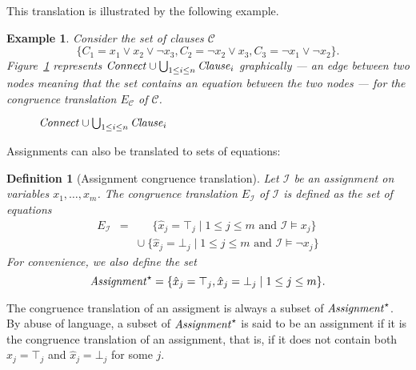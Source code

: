 \documentclass{easychair}
\newtheorem{example}{Example}
\newtheorem{definition}{Definition}
\begin{document}
\noindent This translation is illustrated by the following example.

\begin{example}\label{ex:np1}
Consider the set of clauses $\mathcal{C}$
\begin{equation*}
\big\{C_1 = x_1 \vee x_2 \vee \neg x_3, C_2 = \neg x_2 \vee x_3, C_3 = \neg x_1 \vee \neg x_2\big\}.
\end{equation*}
Figure~\ref{fig:npexamplebig} represents ${\it Connect} \cup \bigcup_{1 \leq i \leq n}{\it Clause}_i$
graphically --- an edge between two nodes meaning that the set contains an
equation between the two nodes --- for the congruence translation $E_{\mathcal{C}}$ of
$\mathcal{C}$.

\begin{figure}[ht]

\caption{${\it Connect} \cup \bigcup_{1 \leq i \leq n}{\it Clause}_i$}
\label{fig:npexamplebig}
\end{figure}

\end{example}

Assignments can also be translated to sets of equations:
\begin{definition}[Assignment congruence translation]
Let $\mathcal{I}$ be an assignment on variables $x_1,\ldots,x_m$.
The congruence translation $E_{\mathcal{I}}$ of $\mathcal{I}$ is defined as the set of equations
\begin{eqnarray*}
  E_{\mathcal{I}} & = & \phantom{\cup}\ \{ \hat{x}_j = \top_j \mid 1 \leq j \leq m \text{ and } \mathcal{I} \models x_j \} \\
               &   & \cup\ \{ \hat{x}_j = \bot_j \mid 1 \leq j \leq m \text{ and } \mathcal{I} \models \neg x_j \}
\end{eqnarray*}
For convenience, we also define the set
\begin{equation*}
  {\it Assignment}^\star = \{ \hat{x}_j = \top_j, \hat{x}_j = \bot_j \mid 1 \leq j \leq m\}.
\end{equation*}
\end{definition}
\noindent
The congruence translation of an assigment is always a subset of
${\it Assignment}^\star$.  By abuse of language, a subset of ${\it Assignment}^\star$ is
said to be an assignment if it is the congruence translation of an assignment,
that is, if it does not contain both $\hat{x}_j = \top_j$ and $\hat{x}_j =
\bot_j$ for some $j$.
\end{document}
